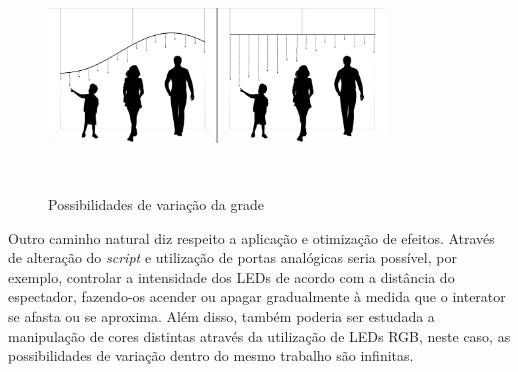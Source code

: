 \begin{figure}[H]
  \begin{center}
    \caption{Possibilidades de variação da grade}
    \vspace*{0,2cm}
    \includegraphics[width=0.8\textwidth]{./04-figuras/malha_futuro}
    \label{fig:malha_futuro}
  \end{center}
  \vspace*{-0,9cm}
  \\
\end{figure}

Outro caminho natural diz respeito a aplicação e otimização de efeitos. Através de alteração do \textit{script} e utilização de portas analógicas seria possível, por exemplo, controlar a intensidade dos LEDs de acordo com a distância do espectador, fazendo-os acender ou apagar gradualmente à medida que o interator se afasta ou se aproxima. Além disso, também poderia ser estudada a manipulação de cores distintas através da utilização de LEDs RGB, neste caso, as possibilidades de variação dentro do mesmo trabalho são infinitas.

